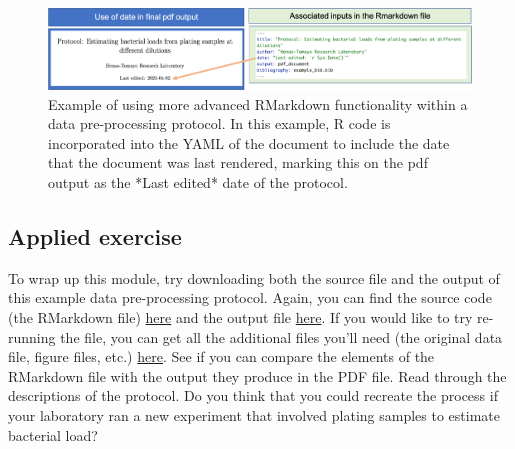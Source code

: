 \documentclass[]{tufte-book}
\begin{document}
\begin{figure}
\includegraphics[width=\textwidth]{figures/protocol_yaml_date} \caption[Example of using more advanced RMarkdown functionality within a data pre-processing protocol]{Example of using more advanced RMarkdown functionality within a data pre-processing protocol. In this example, R code is incorporated into the YAML of the document to include the date that the document was last rendered, marking this on the pdf output as the *Last edited* date of the protocol.}\label{fig:protocolyaml}
\end{figure}

\subsection{Applied exercise}\label{applied-exercise-2}

To wrap up this module, try downloading both the source file and the output of this example
data pre-processing protocol. Again, you can find the source code (the RMarkdown file)
\href{https://raw.githubusercontent.com/geanders/improve_repro/master/data/bactcountr_example_data/example_protocol.Rmd}{here} and the output file \href{https://github.com/geanders/improve_repro/raw/master/data/bactcountr_example_data/example_protocol.pdf}{here}. If you would like to try re-running the file, you can get all the additional files
you'll need (the original data file, figure files, etc.) \href{https://github.com/geanders/improve_repro/tree/master/data/bactcountr_example_data}{here}. See if
you can compare the elements of the RMarkdown file with the output they produce in the
PDF file. Read through the descriptions of the protocol. Do you think that you could recreate
the process if your laboratory ran a new experiment that involved plating samples to
estimate bacterial load?


\end{document}
